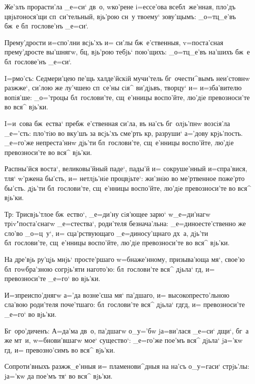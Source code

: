 Же'злъ прорасти'ла _е=си` дв~о, w\т ко'рене i=ессе'ова 
всебл~же'нная, пло'дъ цвjьтонося'щи сп~си'тельный, 
вjь'рою сн~у твоему` зову'щымъ: _о=тц_е'въ бж~е 
бл~гослове'нъ _е=си`.

Прему'дрости и=спо'лни всjь'хъ и= си'лы бж~е'ственныя, 
v=поста'сная прему'дросте вы'шнягw, бц, вjь'рою 
тебjь` пою'щихъ: _о=тц_е'въ на'шихъ бж~е бл~гослове'нъ 
_е=си`.


I=рмо'съ: Седмери'цею пе'щь халде'йскiй мучи'тель 
бг~очести^вымъ неи'стовнw разжже`, си'лою же лу'чшею 
сп~се'ны сiя^ ви'дjьвъ, творцу` и= и=зба'вителю вопiя'ше: 
_о='троцы бл~гослови'те, сщ~е'нницы воспо'йте, лю'дiе 
превозноси'те во вся^ вjь'ки.

I=и~сова бж~ества` пребж~е'ственная си'ла, въ на'съ 
бг~олjь'пнw возсiя'ла _е='сть: пло'тiю во вку'шъ за 
всjь'хъ сме'рть кр, разруши` а='дову крjь'пость. 
_е=го'же непреста'ннw дjь'ти бл~гослови'те, сщ~е'нницы 
воспо'йте, лю'дiе превозноси'те во вся^ вjь'ки.

Распны'йся воста`, великовы'йный паде`, пады'й и= 
сокруше'нный и=спра'вися, тля` w'ржена бы'сть, и= 
нетлjь'нiе процвjьте`: жи'знiю во ме'ртвенное поже'рто 
бы'сть. дjь'ти бл~гослови'те, сщ~е'нницы воспо'йте, 
лю'дiе превозноси'те во вся^ вjь'ки.

Тр: Трисвjь'тлое бж~ество`, _е=ди'ну сiя'ющее 
зарю` w\т _е=ди'нагw трiv"поста'снагw _е=стества`, 
роди'теля безнача'льна: _е=диноесте'ственно же сло'во 
_о=ц~у`, и= сца'рствующаго _е=диносу'щнаго дх~а, дjь'ти 
бл~гослови'те, сщ~е'нницы воспо'йте, лю'дiе превозноси'те 
во вся^ вjь'ки.


На дре'вjь ру'цjь мнjь` просте'ршаго w=бнаже'нному, 
призыва'юща мя`, свое'ю бл~гоwбра'зною согрjь'яти 
нагото'ю: бл~гослови'те вся^ дjьла` гд, и= 
превозноси'те _е=го` во вjь'ки.

И=з\ъ преиспо'днягw а='да возне'сша мя` па'дшаго, и= 
высокопресто'льною сла'вою роди'теля поче'тшаго: 
бл~гослови'те вся^ дjьла` гд гд, и= превозноси'те 
_е=го` во вjь'ки.

Бг~оро'диченъ: А=да'ма дв~о, па'дшагw о_у='бw 
jа=ви'лася _е=си` дщи`, бг~а же мт~и, w=бнови'вшагw мое` 
существо`: _е=го'же пое'мъ вся^ дjьла` jа='кw гд, и= 
превозно'симъ во вся^ вjь'ки.


Сопроти'вныхъ разжж_е'нныя и= пламенови^дныя на на'съ 
о_у=гаси` стрjь'лы: jа='кw да пое'мъ тя` во вся^ вjь'ки.


